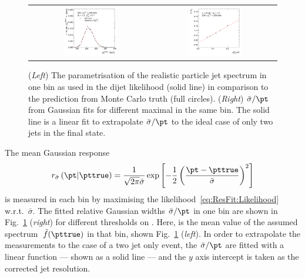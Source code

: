 \begin{figure}[ht]
  \centering
  \begin{tabular}{cc}
    \includegraphics[width=0.45\textwidth]{figures/ResFit_Spring10QCDFlat_Gauss_Eta0_Spectrum_PtBin6} &
    \includegraphics[width=0.45\textwidth]{figures/ResFit_Spring10QCDFlat_Gauss_Eta0_ExtrapolatedPar0_PtBin6}
  \end{tabular}
\caption{(\textit{Left}) The parametrisation of the realistic particle jet \pt spectrum in one \pt bin as used in the dijet likelihood (solid line) in comparison to the prediction from Monte Carlo truth (full circles). 
  (\textit{Right}) $\bar{\sigma}/\pt$ from Gaussian fits for different maximal \ptrel in the same \pt bin.
  The solid line is a linear fit to extrapolate $\bar{\sigma}/\pt$ to the ideal case of only two jets in the
  final state.}
\label{fig:ResFit:QCDMC:Extrapolation:Gauss:ExBin:SpectrumAndExtrapolation}
\end{figure}

The mean Gaussian response
\begin{equation*}
  r_{\bar{\sigma}}\left(\pt|\pttrue\right) = 
  \frac{1}{\sqrt{2\pi}\bar{\sigma}}\exp\left[-\frac{1}{2}\left(\frac{\pt - \pttrue}{\bar{\sigma}}\right)^{2}\right]
\end{equation*}
is measured in each bin by maximising the likelihood~\eqref{eq:ResFit:Likelihood} w.r.t.~$\bar{\sigma}$.
The fitted relative Gaussian widths $\bar{\sigma}/\pt$ in one \pt bin are shown in Fig.~\ref{fig:ResFit:QCDMC:Extrapolation:Gauss:ExBin:SpectrumAndExtrapolation} (\textit{right}) for different thresholds on \ptrel.
Here, \pt is the mean value of the assumed spectrum~$\tilde{f}(\pttrue)$ in that bin, shown Fig.~\ref{fig:ResFit:QCDMC:Extrapolation:Gauss:ExBin:SpectrumAndExtrapolation} (\textit{left}).
In order to extrapolate the measurements to the case of a two jet only event, the $\bar{\sigma}/\pt$ are fitted with a linear function --- shown as a solid line --- and the $y$ axis intercept is taken as the corrected jet \pt resolution.

